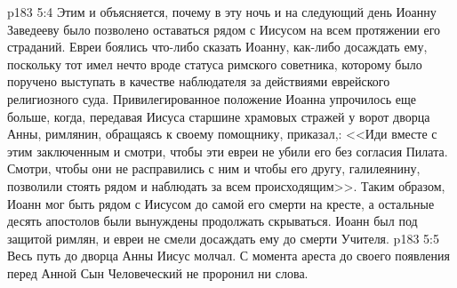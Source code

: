 \vs p183 5:4 Этим и объясняется, почему в эту ночь и на следующий день Иоанну Заведееву было позволено оставаться рядом с Иисусом на всем протяжении его страданий. Евреи боялись что\hyp{}либо сказать Иоанну, как\hyp{}либо досаждать ему, поскольку тот имел нечто вроде статуса римского советника, которому было поручено выступать в качестве наблюдателя за действиями еврейского религиозного суда. Привилегированное положение Иоанна упрочилось еще больше, когда, передавая Иисуса старшине храмовых стражей у ворот дворца Анны, римлянин, обращаясь к своему помощнику, приказал,: <<Иди вместе с этим заключенным и смотри, чтобы эти евреи не убили его без согласия Пилата. Смотри, чтобы они не расправились с ним и чтобы его другу, галилеянину, позволили стоять рядом и наблюдать за всем происходящим>>. Таким образом, Иоанн мог быть рядом с Иисусом до самой его смерти на кресте, а остальные десять апостолов были вынуждены продолжать скрываться. Иоанн был под защитой римлян, и евреи не смели досаждать ему до смерти Учителя.
\vs p183 5:5 Весь путь до дворца Анны Иисус молчал. С момента ареста до своего появления перед Анной Сын Человеческий не проронил ни слова.
